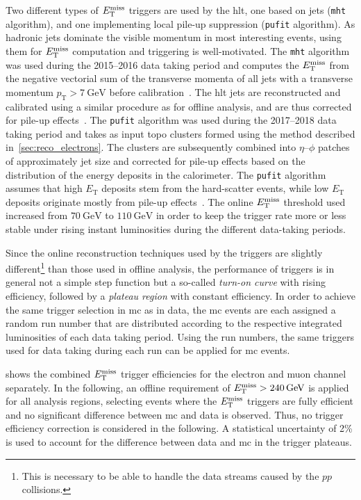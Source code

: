 Two different types of $E_{\textrm{T}}^{\textrm{miss}}$ triggers are used by the \gls{hlt}, one based on jets (\texttt{mht} algorithm), and one implementing local pile-up suppression (\texttt{pufit} algorithm). As hadronic jets dominate the visible momentum in most interesting events, using them for $E_{\textrm{T}}^{\textrm{miss}}$ computation and triggering is well-motivated. The \texttt{mht} algorithm was used during the 2015--2016 data taking period and computes the $E_{\textrm{T}}^{\textrm{miss}}$ from the negative vectorial sum of the transverse momenta of all jets with a transverse momentum $p_\mathrm{T} > \SI{7}{\GeV}$ before calibration~\cite{Aad:2020les}. The \gls{hlt} jets are reconstructed and calibrated using a similar procedure as for offline analysis, and are thus corrected for pile-up effects~\cite{Aad:2016nrq}. The \texttt{pufit} algorithm was used during the 2017--2018 data taking period and takes as input topo clusters formed using the method described in~\cref{sec:reco_electrons}. The clusters are subsequently combined into $\eta$--$\phi$ patches of approximately jet size and corrected for pile-up effects based on the distribution of the energy deposits in the calorimeter. The \texttt{pufit} algorithm assumes that high $E_\mathrm{T}$ deposits stem from the hard-scatter events, while low $E_\mathrm{T}$ deposits originate mostly from pile-up effects~\cite{Aad:2020les}. The online $E_{\textrm{T}}^{\textrm{miss}}$ threshold used increased from $\SI{70}{\GeV}$ to $\SI{110}{\GeV}$ in order to keep the trigger rate more or less stable under rising instant luminosities during the different data-taking periods.  

Since the online reconstruction techniques used by the triggers are slightly different\footnote{This is necessary to be able to handle the data streams caused by the $pp$ collisions.} than those used in offline analysis, the performance of triggers is in general not a simple step function but a so-called \textit{turn-on curve} with rising efficiency, followed by a \textit{plateau region} with constant efficiency. In order to achieve the same trigger selection in \gls{mc} as in data, the \gls{mc} events are each assigned a random run number that are distributed according to the respective integrated luminosities of each data taking period. Using the run numbers, the same triggers used for data taking during each run can be applied for \gls{mc} events. 

 shows the combined $E_{\textrm{T}}^{\textrm{miss}}$ trigger efficiencies for the electron and muon channel separately. In the following, an offline requirement of $\etmiss > \SI{240}{\GeV}$ is applied for all analysis regions, selecting events where the $E_{\textrm{T}}^{\textrm{miss}}$ triggers are fully efficient and no significant difference between \gls{mc} and data is observed. Thus, no trigger efficiency correction is considered in the following. A statistical uncertainty of 2\% is used to account for the difference between data and \gls{mc} in the trigger plateaus.


